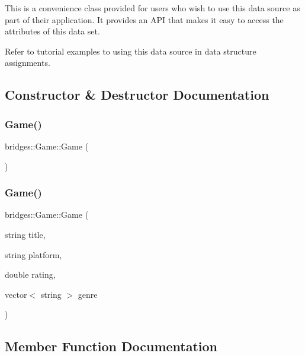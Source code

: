 This is a convenience class provided for users who wish to use this data source as part of their application. It provides an A\+PI that makes it easy to access the attributes of this data set.

Refer to tutorial examples to using this data source in data structure assignments. 

\subsection{Constructor \& Destructor Documentation}
\mbox{\label{classbridges_1_1_game_a44f625a03ebf144931aa9e7e5440303c}} 
\subsubsection{\texorpdfstring{Game()}{Game()}\hspace{0.1cm}{\footnotesize\ttfamily [1/2]}}
{\footnotesize\ttfamily bridges\+::\+Game\+::\+Game (\begin{DoxyParamCaption}{ }\end{DoxyParamCaption})\hspace{0.3cm}{\ttfamily [inline]}}

\mbox{\label{classbridges_1_1_game_ab8064a35bca85871e7088f351ce86af1}} 
\subsubsection{\texorpdfstring{Game()}{Game()}\hspace{0.1cm}{\footnotesize\ttfamily [2/2]}}
{\footnotesize\ttfamily bridges\+::\+Game\+::\+Game (\begin{DoxyParamCaption}\item[{string}]{title,  }\item[{string}]{platform,  }\item[{double}]{rating,  }\item[{vector$<$ string $>$}]{genre }\end{DoxyParamCaption})\hspace{0.3cm}{\ttfamily [inline]}}



\subsection{Member Function Documentation}
\mbox{\label{classbridges_1_1_game_a163f4abb299d588a5987c24e4e7bea05}} 

